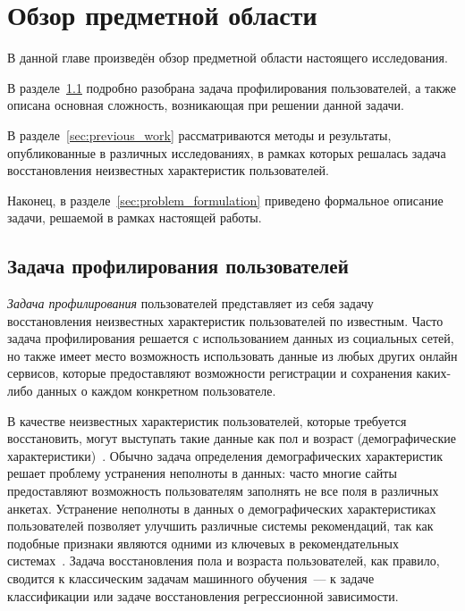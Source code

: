 \chapter{Обзор предметной области}
\label{ch:chapter1}

В данной главе произведён обзор предметной области настоящего
исследования.

В разделе~\ref{sec:profiling_problem} подробно разобрана задача
профилирования пользователей, а также описана основная сложность,
возникающая при решении данной задачи.

В разделе~\ref{sec:previous_work} рассматриваются методы и
результаты, опубликованные в различных исследованиях, в рамках
которых решалась задача восстановления неизвестных характеристик
пользователей.

Наконец, в разделе~\ref{sec:problem_formulation} приведено
формальное описание задачи, решаемой в рамках настоящей
работы.

\section{Задача профилирования пользователей}
\label{sec:profiling_problem}

\textit{Задача профилирования} пользователей представляет из себя
задачу восстановления неизвестных характеристик пользователей
по известным. Часто задача профилирования решается с
использованием данных из социальных сетей, но также имеет
место возможность использовать данные из любых других
онлайн сервисов, которые предоставляют возможности
регистрации и сохранения каких-либо данных о каждом
конкретном пользователе.

В качестве неизвестных характеристик пользователей,
которые требуется восстановить, могут выступать такие данные как пол и 
возраст (демографические характеристики)~\cite{burger2006exploration,
peersman2011predicting,turdakov2013opredelenie,schwartz2013personality,
rosenthal2011age,liu2012inferring,baluja2007boosting}. Обычно задача
определения демографических характеристик решает проблему устранения
неполноты в данных: часто многие сайты предоставляют возможность
пользователям заполнять не все поля в различных анкетах. 
Устранение неполноты в данных о демографических характеристиках
пользователей позволяет улучшить различные системы рекомендаций,
так как подобные признаки являются одними из ключевых в
рекомендательных системах~\cite{swearingen2001beyond,adomavicius2005toward}.
Задача восстановления пола и возраста пользователей, как правило,
сводится к классическим задачам машинного обучения~--- к
задаче классификации или задаче восстановления регрессионной зависимости.


